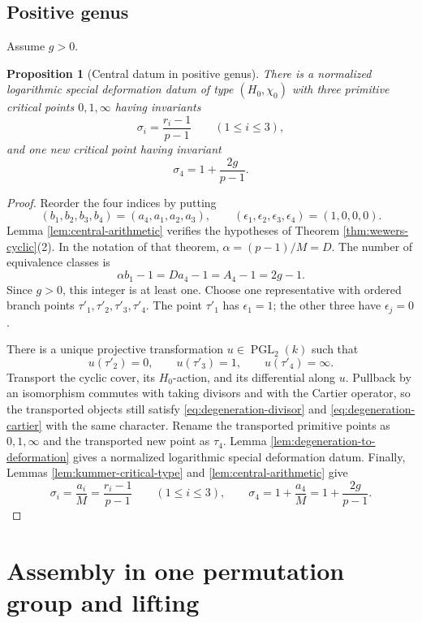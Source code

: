 \documentclass[10pt,a4paper]{amsart}
\newtheorem{proposition}[theorem]{Proposition}
\numberwithin{equation}{section}
\begin{document}
\subsection{Positive genus}
Assume $g>0$.

\begin{proposition}[Central datum in positive genus]
\label{prop:central-positive-genus}
There is a normalized logarithmic special deformation datum of type
$(H_0,\chi_0)$ with three primitive critical points $0,1,\infty$ having
invariants
\[
 \sigma_i=\frac{r_i-1}{p-1}\qquad(1\leq i\leq3),
\]
and one new critical point having invariant
\[
 \sigma_4=1+\frac{2g}{p-1}.
\]
\end{proposition}

\begin{proof}
Reorder the four indices by putting
\[
 (b_1,b_2,b_3,b_4)=(a_4,a_1,a_2,a_3),\qquad
 (\epsilon_1,\epsilon_2,\epsilon_3,\epsilon_4)=(1,0,0,0).
\]
Lemma \ref{lem:central-arithmetic} verifies the hypotheses of Theorem
\ref{thm:wewers-cyclic}(2).  In the notation of that theorem,
$\alpha=(p-1)/M=D$.  The number of equivalence classes is
\[
 \alpha b_1-1=Da_4-1=A_4-1=2g-1.
\]
Since $g>0$, this integer is at least one.  Choose one representative with
ordered branch points
$\tau'_1,\tau'_2,\tau'_3,\tau'_4$.  The point $\tau'_1$ has
$\epsilon_1=1$; the other three have $\epsilon_j=0$.

There is a unique projective transformation $u\in\operatorname{PGL}_2(k)$
such that
\[
 u(\tau'_2)=0,\qquad u(\tau'_3)=1,\qquad
 u(\tau'_4)=\infty.
\]
Transport the cyclic cover, its $H_0$-action, and its differential along
$u$.  Pullback by an isomorphism commutes with taking divisors and with the
Cartier operator, so the transported objects still satisfy
\eqref{eq:degeneration-divisor} and \eqref{eq:degeneration-cartier} with
the same character.  Rename the transported primitive points as
$0,1,\infty$ and the transported new point as $\tau_4$.  Lemma
\ref{lem:degeneration-to-deformation} gives a normalized logarithmic special
deformation datum.  Finally, Lemmas \ref{lem:kummer-critical-type} and
\ref{lem:central-arithmetic} give
\[
 \sigma_i=\frac{a_i}{M}=\frac{r_i-1}{p-1}\qquad(1\leq i\leq3),
 \qquad
 \sigma_4=1+\frac{a_4}{M}=1+\frac{2g}{p-1}.
\]
\end{proof}

\section{Assembly in one permutation group and lifting}
\label{sec:assembly}
\end{document}
